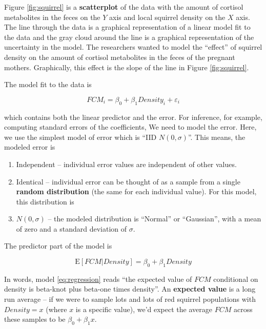 \documentclass[]{book}
\providecommand{\tightlist}{%
  \setlength{\itemsep}{0pt}\setlength{\parskip}{0pt}}
\theoremstyle{definition}
\theoremstyle{definition}
\theoremstyle{definition}
\theoremstyle{remark}
\begin{document}
Figure \ref{fig:squirrel} is a \textbf{scatterplot} of the data with the
amount of cortisol metabolites in the feces on the \(Y\) axis and local
squirrel density on the \(X\) axis. The line through the data is a
graphical representation of a linear model fit to the data and the gray
cloud around the line is a graphical representation of the uncertainty
in the model. The researchers wanted to model the ``effect'' of squirrel
density on the amount of cortisol metabolites in the feces of the
pregnant mothers. Graphically, this effect is the slope of the line in
Figure \ref{fig:squirrel}.

The model fit to the data is

\begin{equation}
FCM_i = \beta_0 + \beta_1 Density_i + \varepsilon_i
\label{eq:fcm-model}
\end{equation}

which contains both the linear predictor and the error. For inference,
for example, computing standard errors of the coefficients, We need to
model the error. Here, we use the simplest model of error which is ``IID
\(N(0, \sigma)\)''. This means, the modeled error is

\begin{enumerate}
\def\labelenumi{\arabic{enumi}.}
\tightlist
\item
  Independent -- individual error values are independent of other
  values.
\item
  Identical -- individual error can be thought of as a sample from a
  single \textbf{random distribution} (the same for each individual
  value). For this model, this distribution is
\item
  \(N(0, \sigma)\) -- the modeled distribution is ``Normal'' or
  ``Gaussian'', with a mean of zero and a standard deviation of
  \(\sigma\).
\end{enumerate}

The predictor part of the model is

\begin{equation}
\textrm{E}[FCM|Density] = \beta_0 + \beta_1 Density
\label{eq:regression}
\end{equation}

In words, model \eqref{eq:regression} reads ``the expected value of
\(FCM\) conditional on density is beta-knot plus beta-one times
density''. An \textbf{expected value} is a long run average -- if we
were to sample lots and lots of red squirrel populations with
\(Density=x\) (where \(x\) is a specific value), we'd expect the average
\(FCM\) across these samples to be \(\beta_0 + \beta_1 x\).
\end{document}
